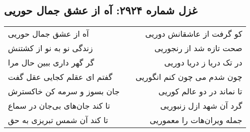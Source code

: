 \begin{center}
\section*{غزل شماره ۲۹۲۴: آه از عشق جمال حوریی}
\label{sec:2924}
\begin{longtable}{l p{0.5cm} r}
آه از عشق جمال حوریی
&&
کو گرفت از عاشقانش دوریی
\\
زندگی نو به نو از کشتنش
&&
صحت تازه شد از رنجوریی
\\
گر گهر داری ببین حال مرا
&&
در تک دریا ز دریا دوریی
\\
گفتم ای عقلم کجایی عقل گفت
&&
چون شدم می چون کنم انگوریی
\\
جان بسوز و سرمه کن خاکسترش
&&
تا نماند در دو عالم کوریی
\\
تا کند جان‌های بی‌جان در سماع
&&
گرد آن شهد ازل زنبوریی
\\
تا کند آن شمس تبریزی به حق
&&
جمله ویران‌هات را معموریی
\\
\end{longtable}
\end{center}
